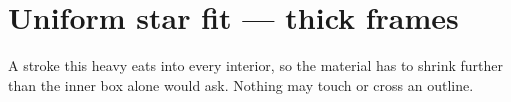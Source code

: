 \documentclass{jlreq}
\begin{document}
\section*{Uniform star fit --- thick frames}

\KKSfitsuite

\noindent A stroke this heavy eats into every interior, so the material has
to shrink further than the inner box alone would ask.  Nothing may touch or
cross an outline.\par
\medskip
{}\par
{}\par
{}\par
{}\par
\medskip
{\LARGE{}}
\end{document}
